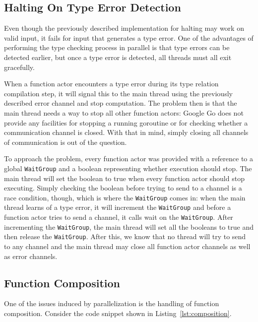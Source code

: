 \documentclass{acm_proc_article-sp}
\begin{document}
	\subsection{Halting On Type Error Detection}
		\label{subsec:errorhalting}

		Even though the previously described implementation for halting may
		work on valid input, it fails for input that generates a type error.
		One of the advantages of performing the type checking process in
		parallel is that type errors can be detected earlier, but once a type
		error is detected, all threads must all exit gracefully. 

		When a function actor encounters a type error during its type relation
		compilation step, it will signal this to the main thread using the
		previously described error channel and stop computation. The problem
		then is that the main thread needs a way to stop all other function
		actors: Google Go does not provide any facilities for stopping a
		running goroutine or for checking whether a communication channel is
		closed. With that in mind, simply closing all channels of communication
		is out of the question.

		To approach the problem, every function actor was provided with a
		reference to a global \texttt{WaitGroup} and a boolean representing
		whether execution should stop. The main thread will set the boolean to
		true when every function actor should stop executing. Simply checking
		the boolean before trying to send to a channel is a race condition,
		though, which is where the \texttt{WaitGroup} comes in: when the main
		thread learns of a type error, it will increment the \texttt{WaitGroup}
		and before a function actor tries to send a channel, it calls wait on
		the \texttt{WaitGroup}. After incrementing the \texttt{WaitGroup}, the
		main thread will set all the booleans to true and then release the
		\texttt{WaitGroup}. After this, we know that no thread will try to send
		to any channel and the main thread may close all function actor
		channels as well as error channels.

	\subsection{Function Composition}
		\label{subsec:funccomp}

		One of the issues induced by parallelization is the handling of
		function composition. Consider the code snippet shown in 
		Listing~\ref{lst:composition}.
\end{document}
